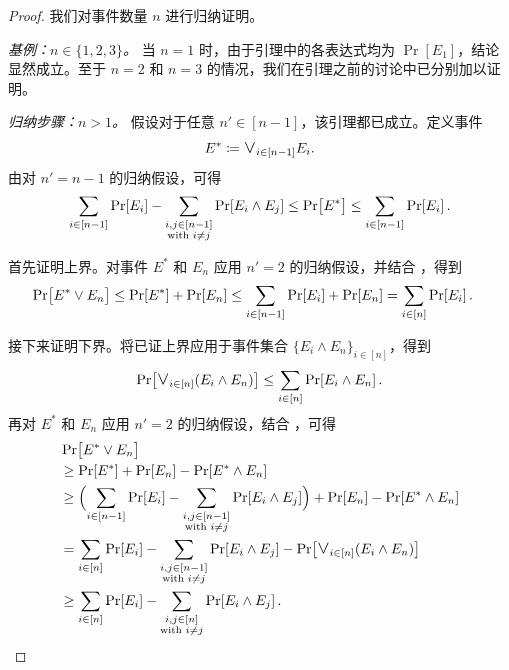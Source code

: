 \documentclass[american,singlepageview]{snargs-book-zh}
\renewcommand{\enspace}{\ensuremath{\thinspace}}
\newcommand{\DefineEqual}{\coloneqq}
\newcommand{\Event}{E}
\newcommand{\idxlor}[1]{\scalebox{1.3}{$\lor$}_{#1}}
\begin{document}
\begin{proof}
我们对事件数量 $n$ 进行归纳证明。

\emph{基例：$n \in \{1,2,3\}$。}
当 $n=1$ 时，由于引理中的各表达式均为 $\Pr[\Event_{1}]$，结论显然成立。至于 $n=2$ 和 $n=3$ 的情况，我们在引理之前的讨论中已分别加以证明。

\emph{归纳步骤：$n>1$。}
假设对于任意 $n'\in[n-1]$，该引理都已成立。定义事件
\[
  \Event^{*} \DefineEqual \idxlor{i \in [n-1]} \Event_{i}.
\]
由对 $n'=n-1$ 的归纳假设，可得
\begin{align}
\label{equation:inclusion-exclusion-2-eq1}
\sum_{i \in [n-1]} \Pr[\Event_{i}] -
\sum_{\substack{i,j \in [n-1] \\ \text{with } i \neq j}} \Pr[\Event_{i} \land \Event_{j}]
\leq
\Pr\bigl[\Event^{*}\bigr]
\leq
\sum_{i \in [n-1]} \Pr[\Event_{i}]
\enspace.
\end{align}

首先证明上界。对事件 $\Event^{*}$ 和 $\Event_{n}$ 应用 $n'=2$ 的归纳假设，并结合 ，得到
\begin{align*}
\Pr\bigl[\Event^{*} \lor \Event_{n}\bigr]
&\leq \Pr[\Event^{*}] + \Pr[\Event_{n}]
\leq \sum_{i \in [n-1]} \Pr[\Event_{i}] + \Pr[\Event_{n}]
= \sum_{i \in [n]} \Pr[\Event_{i}]
\enspace.
\end{align*}

接下来证明下界。将已证上界应用于事件集合 $\{\Event_{i} \land \Event_{n}\}_{i \in [n]}$，得到
\begin{align}
\label{equation:inclusion-exclusion-2-eq2}
\Pr\bigl[\idxlor{i \in [n]} (\Event_{i} \land \Event_{n})\bigr]
\leq \sum_{i \in [n]}\Pr[\Event_{i} \land \Event_{n}]
\enspace.
\end{align}
再对 $\Event^{*}$ 和 $\Event_{n}$ 应用 $n'=2$ 的归纳假设，结合 ，可得
\begin{align*}
& \Pr\bigl[\Event^{*} \lor \Event_{n}\bigr]
\\ &\geq
\Pr[\Event^{*}] + \Pr[\Event_{n}] - \Pr[\Event^{*} \land \Event_{n}]
\\ &\geq
\Bigl(\sum_{i \in [n-1]} \Pr[\Event_{i}] - \sum_{\substack{i,j \in [n-1] \\ \text{with } i \neq j}} \Pr[\Event_{i} \land \Event_{j}]\Bigr)
+ \Pr[\Event_{n}] - \Pr[\Event^{*} \land \Event_{n}]
\\ &=
\sum_{i \in [n]} \Pr[\Event_{i}]
- \sum_{\substack{i,j \in [n-1] \\ \text{with } i \neq j}} \Pr[\Event_{i} \land \Event_{j}]
- \Pr\bigl[\idxlor{i \in [n]} (\Event_{i} \land \Event_{n})\bigr]
\\ &\geq
\sum_{i \in [n]} \Pr[\Event_{i}]
-
\sum_{\substack{i,j \in [n] \\ \text{with } i \neq j}} \Pr[\Event_{i} \land \Event_{j}]
\enspace.
\end{align*}
\end{proof}
\end{document}
